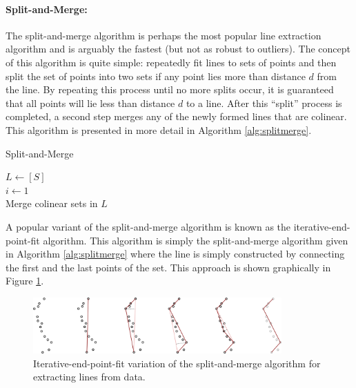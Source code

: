 \paragraph{Split-and-Merge:}
The split-and-merge algorithm is perhaps the most popular line extraction algorithm and is arguably the fastest (but not as robust to outliers). The concept of this algorithm is quite simple: repeatedly fit lines to sets of points and then split the set of points into two sets if any point lies more than distance $d$ from the line. By repeating this process until no more splits occur, it is guaranteed that all points will lie less than distance $d$ to a line. After this ``split'' process is completed, a second step merges any of the newly formed lines that are colinear. This algorithm is presented in more detail in Algorithm \ref{alg:splitmerge}.
\begin{algorithm}[ht]\caption{Split-and-Merge} \label{alg:splitmerge}
	$L \xleftarrow{} [S]$ \\
	$i \xleftarrow{} 1$ \\
	Merge colinear sets in $L$
\end{algorithm}
A popular variant of the split-and-merge algorithm is known as the iterative-end-point-fit algorithm. This algorithm is simply the split-and-merge algorithm given in Algorithm \ref{alg:splitmerge} where the line is simply constructed by connecting the first and the last points of the set. This approach is shown graphically in Figure \ref{fig:splitmerge}.
\begin{figure}[ht]
\centering
	\includegraphics[width=0.85\textwidth]{tex/figs/ch11_figs/iterative_end_point_fit.png}
	\caption{Iterative-end-point-fit variation of the split-and-merge algorithm for extracting lines from data.}
	\label{fig:splitmerge}
\end{figure}

